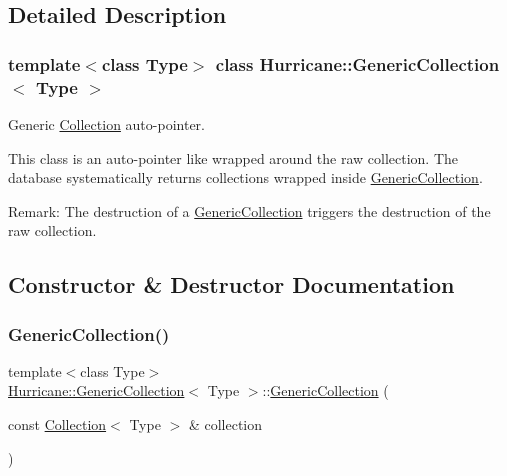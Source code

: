 \subsection{Detailed Description}
\subsubsection*{template$<$class Type$>$\newline
class Hurricane\+::\+Generic\+Collection$<$ Type $>$}

Generic \hyperlink{classHurricane_1_1Collection}{Collection} auto-\/pointer. 

This class is an auto-\/pointer like wrapped around the raw collection. The database systematically returns collections wrapped inside \hyperlink{classHurricane_1_1GenericCollection}{Generic\+Collection}.

\begin{DoxyParagraph}{Remark\+:}
The destruction of a \hyperlink{classHurricane_1_1GenericCollection}{Generic\+Collection} triggers the destruction of the raw collection. 
\end{DoxyParagraph}


\subsection{Constructor \& Destructor Documentation}
\mbox{\label{classHurricane_1_1GenericCollection_a177ca321f1b7761c8b000a59051ba9f9}} 
\subsubsection{\texorpdfstring{Generic\+Collection()}{GenericCollection()}\hspace{0.1cm}{\footnotesize\ttfamily [1/3]}}
{\footnotesize\ttfamily template$<$class Type$>$ \\
\hyperlink{classHurricane_1_1GenericCollection}{Hurricane\+::\+Generic\+Collection}$<$ Type $>$\+::\hyperlink{classHurricane_1_1GenericCollection}{Generic\+Collection} (\begin{DoxyParamCaption}\item[{const \hyperlink{classHurricane_1_1Collection}{Collection}$<$ Type $>$ \&}]{collection }\end{DoxyParamCaption})\hspace{0.3cm}{\ttfamily [inline]}}


